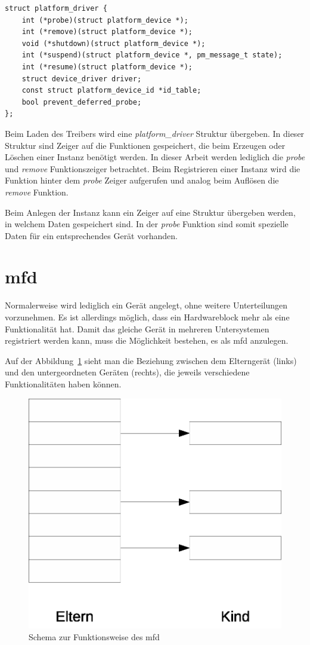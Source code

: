 \begin{lstfloat}
\begin{lstlisting}
struct platform_driver {
	int (*probe)(struct platform_device *);
	int (*remove)(struct platform_device *);
	void (*shutdown)(struct platform_device *);
	int (*suspend)(struct platform_device *, pm_message_t state);
	int (*resume)(struct platform_device *);
	struct device_driver driver;
	const struct platform_device_id *id_table;
	bool prevent_deferred_probe;
};
\end{lstlisting}
\end{lstfloat}

Beim Laden des Treibers wird eine \textit{platform\_driver} Struktur übergeben. In dieser Struktur sind Zeiger auf die Funktionen gespeichert, die beim Erzeugen oder Löschen einer Instanz benötigt werden.  
In dieser Arbeit werden lediglich die \textit{probe} und \textit{remove} Funktionszeiger betrachtet. Beim Registrieren einer Instanz wird die Funktion hinter dem \textit{probe} Zeiger aufgerufen und analog beim Auflösen die \textit{remove} Funktion.\cite{corbetplatform}  %

Beim Anlegen der Instanz kann ein Zeiger auf eine Struktur übergeben werden, in welchem Daten gespeichert sind. In der \textit{probe} Funktion sind somit spezielle Daten für ein entsprechendes Gerät vorhanden. \cite{corbetplatform} %

\section{\acl{mfd}}\label{sec:mfd_t}
Normalerweise wird lediglich ein Gerät angelegt, ohne weitere Unterteilungen vorzunehmen. Es ist allerdings möglich, dass ein Hardwareblock mehr als eine Funktionalität hat. Damit das gleiche Gerät in mehreren Untersystemen registriert werden kann, muss die Möglichkeit bestehen, es als \ac{mfd} anzulegen. \cite{bellonimfd} %

Auf der Abbildung~\ref{fig:mfd} sieht man die Beziehung zwischen dem Elterngerät (links) und den untergeordneten Geräten (rechts), die jeweils verschiedene Funktionalitäten haben können.

\begin{figure}[!hbtp]
	\centering
	\includegraphics[width = 0.4\linewidth]{pictures/2020-01-16-MFD.eps}
	\smallskip
	\caption{Schema zur Funktionsweise des \ac{mfd}}
	\label{fig:mfd}
\end{figure} 


